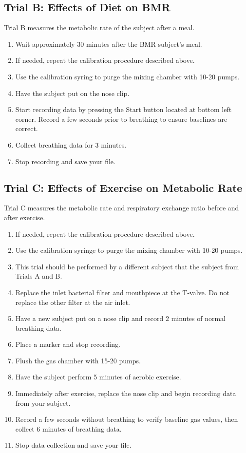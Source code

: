 \documentclass{article}
\begin{document}
\subsection*{Trial B: Effects of Diet on BMR}
Trial B measures the metabolic rate of the subject after a meal.
\begin{enumerate}
	\item Wait approximately 30 minutes after the BMR subject's meal.
	\item If needed, repeat the calibration procedure described above.
	\item Use the calibration syring to purge the mixing chamber with 10-20 pumps.
	\item Have the subject put on the nose clip.
	\item Start recording data by pressing the Start button located at bottom left corner. Record a few seconds prior to breathing to ensure baselines are correct.
	\item Collect breathing data for 3 minutes.
	\item Stop recording and save your file.
\end{enumerate}

\subsection*{Trial C: Effects of Exercise on Metabolic Rate}
Trial C measures the metabolic rate and respiratory exchange ratio before and after exercise.
\begin{enumerate}
	\item If needed, repeat the calibration procedure described above.
	\item Use the calibration syringe to purge the mixing chamber with 10-20 pumps.
	\item This trial should be performed by a different subject that the subject from Trials A and B.
	\item Replace the inlet bacterial filter and mouthpiece at the T-valve. Do not replace the other filter at the air inlet.
	\item Have a new subject put on a nose clip and record 2 minutes of normal breathing data.
	\item Place a marker and stop recording.
	\item Flush the gas chamber with 15-20 pumps.
	\item Have the subject perform 5 minutes of aerobic exercise.
	\item Immediately after exercise, replace the nose clip and begin recording data from your subject.
	\item Record a few seconds without breathing to verify baseline gas values, then collect 6 minutes of breathing data.
	\item Stop data collection and save your file.
\end{enumerate}
\end{document}

